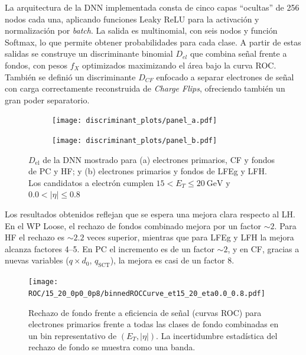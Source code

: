La arquitectura de la DNN implementada consta de cinco capas ``ocultas'' de 256 nodos cada una, aplicando funciones Leaky ReLU para la activación y normalización por \textit{batch}. La salida es multinomial, con seis nodos y función Softmax, lo que permite obtener probabilidades para cada clase. 
A partir de estas salidas se construye un discriminante binomial $D_{el}$ que combina señal frente a fondos, con pesos $f_X$ optimizados maximizando el área bajo la curva ROC. También se definió un discriminante $D_{CF}$ enfocado a separar electrones de señal con carga correctamente reconstruida de \textit{Charge Flips}, ofreciendo también un gran poder separatorio.  

\begin{figure}[htbp]
  \centering
  \begin{subfigure}[t]{0.48\linewidth}
    \centering
    \texttt{[image: discriminant\_plots/panel\_a.pdf]}
    \caption{}
    \label{res:dnnDisc_a}
  \end{subfigure}\hfill
  \begin{subfigure}[t]{0.48\linewidth}
    \centering
    \texttt{[image: discriminant\_plots/panel\_b.pdf]}
    \caption{}
    \label{res:dnnDisc_b}
  \end{subfigure}

  \caption{$D_{\mathrm{el}}$ de la DNN mostrado para (a) electrones primarios, CF y fondos de PC y HF; y (b) electrones primarios y fondos de LFEg y LFH. Los candidatos a electrón cumplen $15<E_{T}\leq 20~\mathrm{GeV}$ y $0.0<|\eta|\leq 0.8$}
  \label{res:dnn_final_disc_ab}
\end{figure}

Los resultados obtenidos reflejan que se espera una mejora clara respecto al LH. En el WP Loose, el rechazo de fondos combinado mejora por un factor $\sim2$. Para HF el rechazo es $\sim2.2$ veces superior, mientras que para LFEg y LFH la mejora alcanza factores 4–5. En PC el incremento es de un factor $\sim2$, y en CF, gracias a nuevas variables ($q\times d_0$, $q_{\text{SCT}}$), la mejora es casi de un factor 8.  

\begin{figure}[h]
  \centering
  \texttt{[image: ROC/15\_20\_0p0\_0p8/binnedROCCurve\_et15\_20\_eta0.0\_0.8.pdf]}
  \caption{Rechazo de fondo frente a eficiencia de señal (curvas ROC) para electrones primarios frente a todas las clases de fondo combinadas en un bin representativo de $(E_{T}, |\eta|)$. La incertidumbre estadística del rechazo de fondo se muestra como una banda.}
  \label{res:roc_allblkg}
\end{figure}


